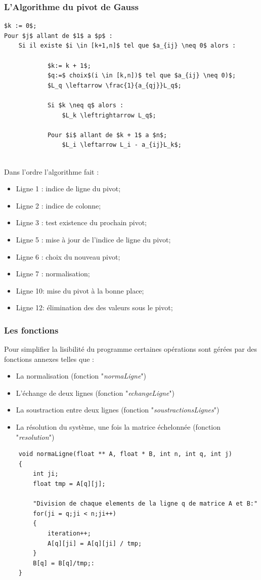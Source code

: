 \documentclass[a4paper]{article}
\begin{document}
\subsubsection{L'Algorithme du pivot de Gauss}

\begin{lstlisting}
$k := 0$;
Pour $j$ allant de $1$ a $p$ :
	Si il existe $i \in [k+1,n]$ tel que $a_{ij} \neq 0$ alors : 
			
			$k:= k + 1$;
			$q:=$ choix$(i \in [k,n])$ tel que $a_{ij} \neq 0)$;
			$L_q \leftarrow \frac{1}{a_{qj}}L_q$;
			
			Si $k \neq q$ alors :
				$L_k \leftrightarrow L_q$;
			
			Pour $i$ allant de $k + 1$ a $n$;
				$L_i \leftarrow L_i - a_{ij}L_k$;
						
\end{lstlisting}

Dans l'ordre l'algorithme fait :

\begin{itemize}
	\item Ligne 1 : indice de ligne du pivot;
	\item Ligne 2 : indice de colonne;
	\item Ligne 3 : test existence du prochain pivot;
	\item Ligne 5 : mise à jour de l'indice de ligne du pivot;
	\item Ligne 6 : choix du nouveau pivot;
	\item Ligne 7 : normalisation;
	\item Ligne 10: mise du pivot à la bonne place;
	\item Ligne 12: élimination des des valeurs sous le pivot;						
\end{itemize} 

\subsubsection{Les fonctions}

Pour simplifier la lisibilité du programme certaines opérations sont gérées par des fonctions annexes telles que :
\newline
\begin{itemize}
	\item La normalisation (fonction "\textit{normaLigne}")
	\item L'échange de deux lignes (fonction "\textit{echangeLigne}")
	\item La soustraction entre deux lignes (fonction "\textit{soustractionsLignes}")
	\item La résolution du système, une fois la matrice échelonnée (fonction "\textit{resolution}")
\end{itemize}
\clearpage
\begin{lstlisting}
	void normaLigne(float ** A, float * B, int n, int q, int j)
	{
		int ji;
		float tmp = A[q][j];
		
		"Division de chaque elements de la ligne q de matrice A et B:"
		for(ji = q;ji < n;ji++)
		{
			iteration++;
			A[q][ji] = A[q][ji] / tmp;
		}
		B[q] = B[q]/tmp;: 
	}
\end{lstlisting}
\end{document}
